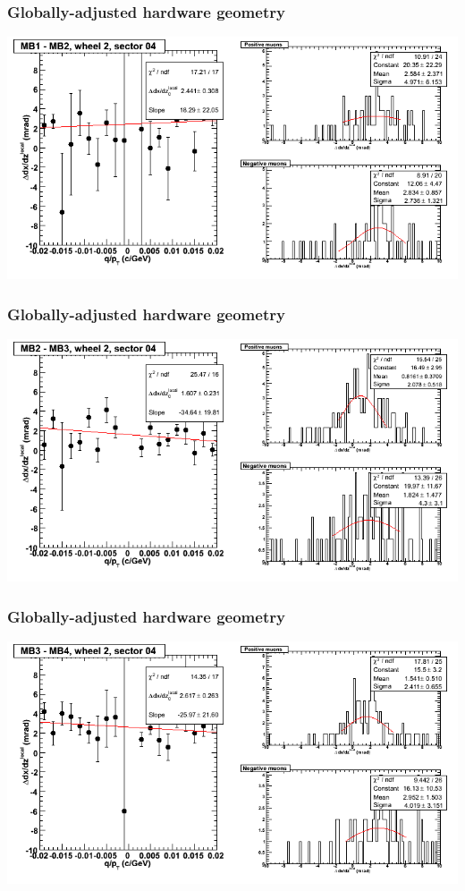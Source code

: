 \documentclass[compress]{beamer}
\begin{document}
\begin{frame}
\frametitle{Globally-adjusted hardware geometry}
\includegraphics[width=\linewidth]{NOV4_segdiffs_HW/dt13_slope_E_04_12.png}
\end{frame}

\begin{frame}
\frametitle{Globally-adjusted hardware geometry}
\includegraphics[width=\linewidth]{NOV4_segdiffs_HW/dt13_slope_E_04_23.png}
\end{frame}

\begin{frame}
\frametitle{Globally-adjusted hardware geometry}
\includegraphics[width=\linewidth]{NOV4_segdiffs_HW/dt13_slope_E_04_34.png}
\end{frame}
\end{document}
